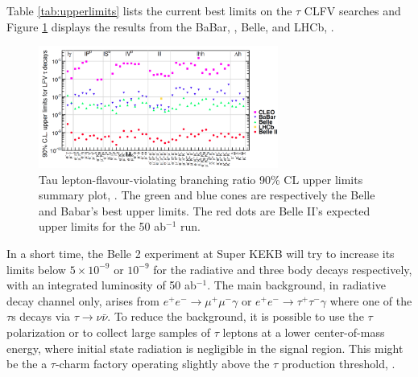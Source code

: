 Table \ref{tab:upperlimits} lists the 
current best limits on the $\tau$ 
CLFV searches and Figure \ref{fig:tauchannel} 
displays the results from the BaBar, 
\cite{PhysRevD.77.091104}, Belle, 
\cite{ABASHIAN2002117} and LHCb, 
\cite{TheLHCbCollaboration2008}. 
\begin{figure}[!h]
  \centering
  \includegraphics[width =0.7\textwidth]{figures/png/Screenshot_20240319_134052.png}
  \caption[Tau lepton-flavour-violating branching ratio upper limits.]{Tau lepton-flavour-violating branching ratio 90\% CL upper limits summary plot, \cite{universe4100101}. The green and blue cones 
  are respectively the Belle and Babar's best upper limits. The red dots are Belle II's expected upper limits for the 50 ab$^{-1}$ run.}
  \label{fig:tauchannel}
  \end{figure}
In a short time, the Belle 2 experiment at 
Super KEKB will try to increase its limits 
below $5 \times 10^{-9}$ or $10^{-9}$ for 
the radiative and three body decays respectively, 
with an integrated luminosity of 50 ab$^{-1}$. 
The main background, in radiative decay  
channel only, arises from
$e^+ e^- \rightarrow \mu^+ \mu^- \gamma$ or 
$e^+ e^- \rightarrow \tau^+ \tau^- \gamma$ 
where one of the $\tau$s decays via 
$\tau \rightarrow \nu \bar{\nu}$.
To reduce the background, it is possible to 
use the $\tau$ polarization or to collect 
large samples of
$\tau$ leptons at a lower center-of-mass energy, 
where initial state radiation is negligible in 
the signal region. This might be the 
 a $\tau$-charm 
factory operating slightly above the $\tau$ 
production threshold, \cite{Bennett_2016}. 





